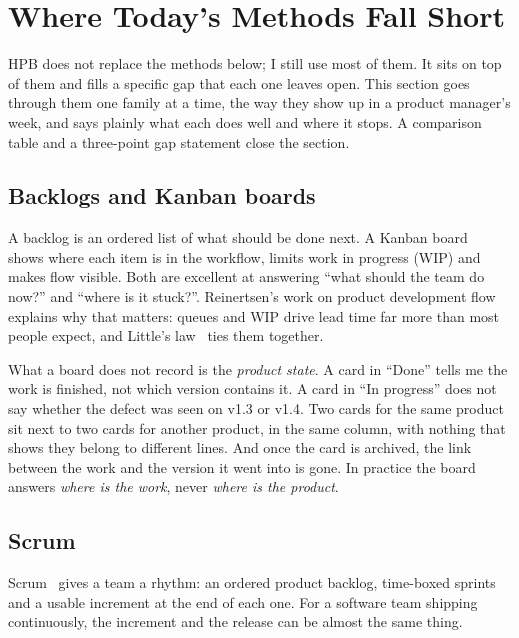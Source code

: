 \section{Where Today's Methods Fall Short}
\label{sec:gaps}

HPB does not replace the methods below; I still use most of them. It sits
on top of them and fills a specific gap that each one leaves open. This
section goes through them one family at a time, the way they show up in a
product manager's week, and says plainly what each does well and where it
stops. A comparison table and a three-point gap statement close the
section.

\subsection{Backlogs and Kanban boards}
\label{sec:gaps-boards}

A backlog is an ordered list of what should be done next. A Kanban
board~\citep{anderson2010kanban} shows where each item is in the workflow,
limits work in progress (WIP) and makes flow visible. Both are excellent at
answering ``what should the team do now?'' and ``where is it stuck?''.
Reinertsen's work on product development flow~\citep{reinertsen2009flow}
explains why that matters: queues and WIP drive lead time far more than
most people expect, and Little's law~\citep{little1961} ties them
together.

What a board does not record is the \emph{product state}. A card in
``Done'' tells me the work is finished, not which version contains it. A
card in ``In progress'' does not say whether the defect was seen on v1.3 or
v1.4. Two cards for the same product sit next to two cards for another
product, in the same column, with nothing that shows they belong to
different lines. And once the card is archived, the link between the work
and the version it went into is gone. In practice the board answers
\emph{where is the work}, never \emph{where is the product}.

\subsection{Scrum}
\label{sec:gaps-scrum}

Scrum~\citep{schwaber2020scrum} gives a team a rhythm: an ordered product
backlog, time-boxed sprints and a usable increment at the end of each one.
For a software team shipping continuously, the increment and the release
can be almost the same thing.

